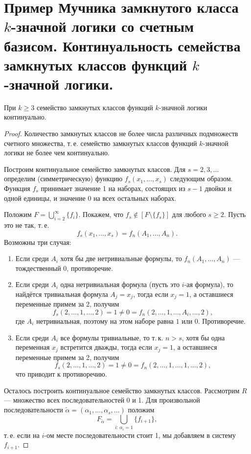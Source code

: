 \section{Пример Мучника замкнутого класса $k$-значной логики со счетным базисом. Континуальность семейства замкнутых классов функций $k$-значной логики.}

\begin{theorem}[A.\,A.\,Мучник]
    При $k \geqslant 3$ семейство замкнутых классов функций $k$-значной логики континуально.
\end{theorem}

\begin{proof}
     Количество замкнутых классов не более числа различных подмножеств счетного множества, т.\,е. семейство замкнутых классов функций $k$-значной логики не более чем континуально.

     Построим континуальное семейство замкнутых классов. Для $s = 2, 3, \ldots$ определим (симметрическую) функцию $f_s(x_1, \ldots, x_s)$ следующим образом. Функция $f_s$ принимает значение 1 на наборах, состоящих из $s - 1$ двойки и одной единицы, и значение 0 на всех остальных наборах.

     Положим $F = \displaystyle \bigcup_{i=2}^\infty\{f_i\}$. Покажем, что $f_s\notin [F \setminus \{f_s\}]$ для любого $s\geqslant 2$. Пусть это не так, т.\,е. 
     \[
        f_s(x_1,\ldots,x_s) = f_n(A_1, \ldots, A_n).
     \]
     Возможны три случая:
     \begin{enumerate}
         \item Если среди $A_i$ хотя бы две нетривиальные формулы, то $f_n(A_1, \ldots, A_n)$ --- тождественный 0, противоречие.
         \item Если среди $A_i$ одна нетривиальная формула (пусть это $i$-ая формула), то найдётся тривиальная формула $A_j = x_j$, тогда если $x_j = 1$, а оставшиеся переменные примем за 2, получим
         \[
            f_s(2, \ldots, 1, \ldots,2) = 1 \neq 0 = f_n(2, \ldots, 1, \ldots, A_i, \ldots, 2),
         \]
         где $A_i$ нетривиальная, поэтому на этом наборе равна $1$ или $0$. Противоречие.
         \item Если среди $A_i$ все формулы тривиальные, то т.\,к. $n > s$, хотя бы одна переменная $x_j$ встретится дважды, тогда если $x_j = 1$, а оставшиеся переменные примем за 2, получим
         \[
            f_s(2, \ldots, 1, \ldots,2) = 1 \neq 0 = f_n(2, \ldots, 1, \ldots, 1, \ldots, 2),
         \]
         что приводит к противоречию.
     \end{enumerate}
     Осталось построить континуальное семейство замкнутых классов. Рассмотрим $R$ --- множество всех последовательностей 0 и 1. Для произвольной последовательности $\widetilde{\alpha} = (\alpha_1, \ldots, \alpha_s, \ldots)$ положим 
     \[
        F_{\widetilde{\alpha}} = \bigcup_{i:\, \alpha_i = 1} \{f_{i+1}\},
     \]
     т.\,е. если на $i$-ом месте последовательности стоит 1, мы добавляем в систему $f_{i+1}$.


\end{proof}
